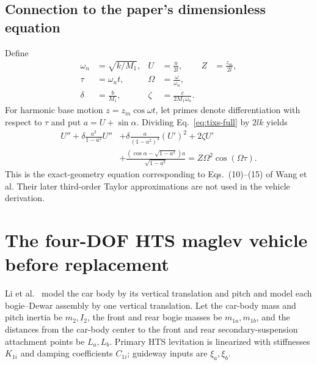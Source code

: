\documentclass[a4paper,12pt]{article}
\numberwithin{equation}{section}
\begin{document}
\subsection{Connection to the paper's dimensionless equation}
Define
\begin{equation}
\begin{aligned}
\omega_n&=\sqrt{k/M_1},&
U&=\frac{u}{2l},&
Z&=\frac{z_m}{2l},\\
\tau&=\omega_nt,&
\Omega&=\frac{\omega}{\omega_n},\\
\delta&=\frac{b}{M_1},&
\zeta&=\frac{c}{2M_1\omega_n}.
\end{aligned}
\end{equation}
For harmonic base motion $z=z_m\cos\omega t$, let primes denote differentiation with respect to $\tau$ and put $a=U+\sin\alpha$. Dividing Eq.~\eqref{eq:tixs-full} by $2lk$ yields
\begin{equation}
\boxed{\begin{aligned}
U''+\delta\frac{a^2}{1-a^2}U''
&+\delta\frac{a}{(1-a^2)^2}(U')^2
 +2\zeta U'\\
&+\frac{(\cos\alpha-\sqrt{1-a^2})a}{\sqrt{1-a^2}}
 =Z\Omega^2\cos(\Omega\tau).
\end{aligned}}
\label{eq:nondimensional}
\end{equation}
This is the exact-geometry equation corresponding to Eqs.~(10)--(15) of Wang et al. Their later third-order Taylor approximations are not used in the vehicle derivation.

\section{The four-DOF HTS maglev vehicle before replacement}
Li et al.~\cite{li2021} model the car body by its vertical translation and pitch and model each bogie--Dewar assembly by one vertical translation. Let the car-body mass and pitch inertia be $m_2,I_2$, the front and rear bogie masses be $m_{1a},m_{1b}$, and the distances from the car-body center to the front and rear secondary-suspension attachment points be $L_a,L_b$. Primary HTS levitation is linearized with stiffnesses $K_{1i}$ and damping coefficients $C_{1i}$; guideway inputs are $\xi_a,\xi_b$.
\end{document}
